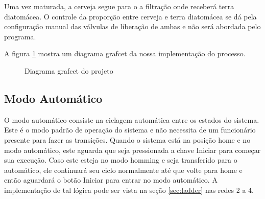 \documentclass[12pt]{article}
\begin{document}
	Uma vez maturada, a cerveja segue para o a filtração onde receberá terra diatomácea. O controle da proporção entre cerveja e terra diatomácea se dá pela configuração manual das válvulas de liberação de ambas e não será abordada pelo programa.
	
	A figura \ref{fig:grafcet} mostra um diagrama grafcet da nossa implementação do processo.
	
	\begin{figure}[H]
		\centering
		\caption{Diagrama grafcet do projeto}
		\label{fig:grafcet}
	\end{figure}
	
	\subsection{Modo Automático}
	O modo automático consiste na ciclagem automática entre os estados do sistema. Este é o modo padrão de operação do sistema e não necessita de um funcionário presente para fazer as transições. Quando o sistema está na posição home e no modo automático, este aguarda que seja pressionada a chave Iniciar para começar sua execução. Caso este esteja no modo homming e seja transferido para o automático, ele continuará seu ciclo normalmente até que volte para home e então aguardará o botão Iniciar para entrar no modo automático. A implementação de tal lógica pode ser vista na seção \ref{sec:ladder} nas redes 2 a 4. 
	
\end{document}
